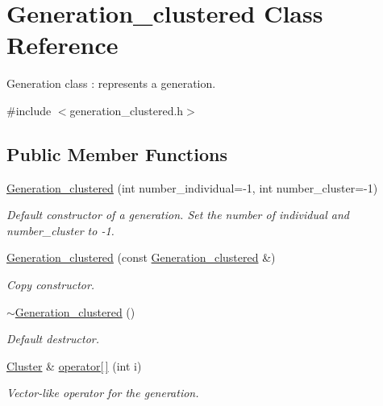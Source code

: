 \hypertarget{class_generation__clustered}{}\section{Generation\+\_\+clustered Class Reference}
\label{class_generation__clustered}


Generation class \+: represents a generation.  




{\ttfamily \#include $<$generation\+\_\+clustered.\+h$>$}

\subsection*{Public Member Functions}
\begin{DoxyCompactItemize}
\item 
\hyperlink{class_generation__clustered_a823bc0f5f9997d846386f9032455909b}{Generation\+\_\+clustered} (int number\+\_\+individual=-\/1, int number\+\_\+cluster=-\/1)
\begin{DoxyCompactList}\small\item\em Default constructor of a generation. Set the number of individual and number\+\_\+cluster to -\/1. \end{DoxyCompactList}\item 
\hyperlink{class_generation__clustered_aaa729c31844ef335a192656e58f2337c}{Generation\+\_\+clustered} (const \hyperlink{class_generation__clustered}{Generation\+\_\+clustered} \&)
\begin{DoxyCompactList}\small\item\em Copy constructor. \end{DoxyCompactList}\item 
\hyperlink{class_generation__clustered_aeb063106dd0dbfd237108e26f3439101}{$\sim$\+Generation\+\_\+clustered} ()
\begin{DoxyCompactList}\small\item\em Default destructor. \end{DoxyCompactList}\item 
\hyperlink{class_cluster}{Cluster} \& \hyperlink{class_generation__clustered_a7b02e7aaaba6cb2d171642044833d485}{operator\mbox{[}$\,$\mbox{]}} (int i)
\begin{DoxyCompactList}\small\item\em Vector-\/like operator for the generation. \end{DoxyCompactList}\item 

\end{DoxyCompactItemize}
